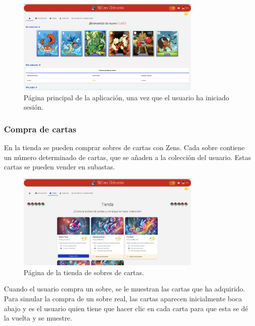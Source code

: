 \begin{figure}[H]
    \centering
    \includegraphics[width=0.8\textwidth]{figures/6-Analisis/6-Interfaz/interfaz/logued.png}
    \caption{Página principal de la aplicación, una vez que el usuario ha iniciado sesión.}
    \label{fig:m-interfaz-logued}
\end{figure}

\subsubsection{Compra de cartas}
En la tienda se pueden comprar sobres de cartas con Zens.
Cada sobre contiene un número determinado de cartas, que se añaden a la colección del usuario.
Estas cartas se pueden vender en subastas.

\begin{figure}[H]
    \centering
    \includegraphics[width=0.8\textwidth]{figures/6-Analisis/6-Interfaz/interfaz/tienda.png}
    \caption{Página de la tienda de sobres de cartas.}
    \label{fig:m-interfaz-tienda}
\end{figure}

Cuando el usuario compra un sobre, se le muestran las cartas que ha adquirido.
Para simular la compra de un sobre real, las cartas aparecen inicialmente boca abajo y es el usuario quien
tiene que hacer clic en cada carta para que esta se dé la vuelta y se muestre.

